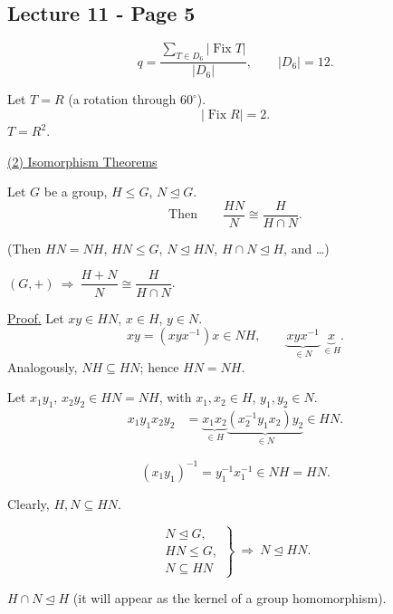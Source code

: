 
\subsection*{Lecture 11 - Page 5}

\[
q=\frac{\displaystyle\sum_{T\in D_6}|\operatorname{Fix}T|}
        {|D_6|},\qquad |D_6|=12.
\]

\noindent Let $T=R$ (a rotation through $60^\circ$).
\[
|\operatorname{Fix}R|=2.
\]
\noindent $T=R^2$.

\bigskip
\noindent\underline{(2) Isomorphism Theorems}

\medskip
\noindent{}

\bigskip
\noindent Let $G$ be a group, $H\leq G$, $N\trianglelefteq G$.
\[
\text{Then}\qquad \boxed{\frac{HN}{N}\cong\frac{H}{H\cap N}}.
\]

\noindent (Then $HN=NH$, $HN\leq G$, $N\trianglelefteq HN$,
$H\cap N\trianglelefteq H$, and \ldots)

\medskip
\noindent $(G,+)\ \Rightarrow\ \dfrac{H+N}{N}\cong\dfrac{H}{H\cap N}$.

\bigskip
\noindent\underline{Proof.}
Let $xy\in HN$, $x\in H$, $y\in N$.
\[
xy=(xyx^{-1})x\in NH,
\qquad
\underbrace{xyx^{-1}}_{\in N}\ \underbrace{x}_{\in H}.
\]
\noindent Analogously, $NH\subseteq HN$; hence $HN=NH$.

\bigskip
\noindent Let $x_1y_1,\,x_2y_2\in HN=NH$, with
$x_1,x_2\in H$, $y_1,y_2\in N$.
\[
\begin{aligned}
x_1y_1x_2y_2
 &=\underbrace{x_1x_2}_{\in H}
   \underbrace{(x_2^{-1}y_1x_2)y_2}_{\in N}
   \in HN.
\end{aligned}
\]

\[
(x_1y_1)^{-1}=y_1^{-1}x_1^{-1}\in NH=HN.
\]

\noindent Clearly, $H,N\subseteq HN$.

\[
\left.\begin{gathered}
N\trianglelefteq G,\\
HN\leq G,\\
N\subseteq HN
\end{gathered}\right\}
\ \Longrightarrow\ N\trianglelefteq HN.
\]

\noindent $H\cap N\trianglelefteq H$
(it will appear as the kernel of a group homomorphism).

